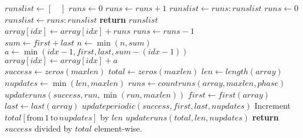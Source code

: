 \documentclass[reprint,amsmath,amssymb,aps,pre]{revtex4-1}
\begin{document}
\begin{algorithmic}[1]
    \State $runslist \gets [\quad]$
    \State $runs \gets 0$
        \State $runs \gets runs + 1$
        \State $runslist \gets runs:runslist$
        \State $runs \gets 0$
      \EndIf
    \EndFor
      \State $runslist \gets runs:runslist$
    \EndIf
    \State \textbf{return} $runslist$
  \EndProcedure
  \\
      \State $array[idx] \gets array[idx] + runs$
      \State $runs \gets runs - 1$
    \EndFor
  \EndProcedure
  \\
    \State $sum \gets first + last$
    \State $n \gets \min(n, sum)$
      \State $a \gets \min(idx - 1, first, last, sum - (idx - 1))$
      \State $array[idx] \gets array[idx] + a$
    \EndFor
  \EndProcedure
  \\
    \State $success \gets zeros(maxlen)$
    \State $total \gets zeros(maxlen)$
    \State $len \gets length(array)$
    \State $nupdates \gets \min(len, maxlen)$
    \State $runs \gets countruns(array, maxlen, phase)$
      \State $updateruns(success, run, \min(run, maxlen))$
    \EndFor
      \State $first \gets first(array)$
      \State $last \gets last(array)$
        \State $updateperiodic(success, first, last, nupdates)$
      \EndIf
      \State Increment $total[\text{from} \, 1 \, \text{to} \, nupdates]$ by
      $len$
    \Else
      \State $updateruns(total, len, nupdates)$
    \EndIf
    \State \textbf{return} $success$ divided by $total$ element-wise.  
  \EndProcedure
\end{algorithmic}
\end{document}
